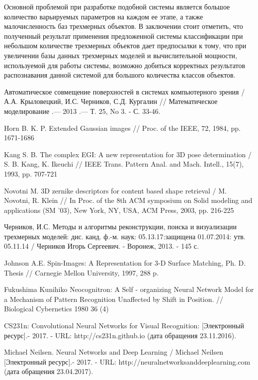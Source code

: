 \documentclass[14pt]{article}
\numberwithin{figure}{section}
\numberwithin{equation}{section}
\begin{document}
Основной проблемой при разработке подобной системы является большое количество варьируемых параметров на каждом ее этапе, а также малочисленность баз трехмерных объектов. В заключении стоит отметить, что полученный результат применения предложенной системы классификации при небольшом количестве трехмерных объектов дает предпосылки к тому, что при увеличении базы данных трехмерных моделей и вычислительной мощности, используемой для работы системы, возможно добиться корректных результатов распознавания данной системой для большого количества классов объектов.

\newpage
{}
\begin{thebibliography}{9}

    Автоматическое совмещение поверхностей в системах компьютерного зрения / А.А. Крыловецкий, И.С. Черников, С.Д. Кургалин // Математическое моделирование .— 2013 .— Т. 25, No 3. - С. 33-46.

	Horn B. K. P. Extended Gaussian images // Proc. of the IEEE, 72, 1984, pp. 1671-1686

	Kang S. B. The complex EGI: A new representation for 3D pose determination / S. B. Kang, K. Ikeuchi // IEEE Trans. Pattern Anal. and Mach. Intell., 15(7), 1993, pp. 707-721

	Novotni M. 3D zernike descriptors for content based shape retrieval / M. Novotni, R. Klein // In Proc. of the 8th ACM symposium on Solid modeling and applications (SM ’03), New York, NY, USA, ACM Press, 2003, pp. 216-225

    Черников, И.С. Методы и алгоритмы реконструкции, поиска и визуализации трехмерных моделей: дис. канд. ф.-м. наук: 05.13.17:защищена 01.07.2014: утв. 05.11.14 / Черников Игорь Сергеевич. - Воронеж, 2013. - 145 с.

	Johnson A.E. Spin-Images: A Representation for 3-D Surface Matching, Ph. D. Thesis // Carnegie Mellon University, 1997, 288 p.


	Fukushima Kunihiko Neocognitron: A Self - organizing Neural Network Model for a Mechanism of Pattern Recognition Unaffected by Shift in Position. // Biological Cybernetics 1980 36 (4)

	CS231n: Convolutional Neural Networks for Visual Recognition: [Электронный ресурс].- 2017. - URL: http://cs231n.github.io (дата обращения 23.11.2016).

    Michael Neilsen. Neural Networks and Deep Learning / Michael Neilsen [Электронный ресурс].- 2017. - URL: http://neuralnetworksanddeeplearning.com (дата обращения 23.04.2017).



\end{thebibliography}
\end{document}
